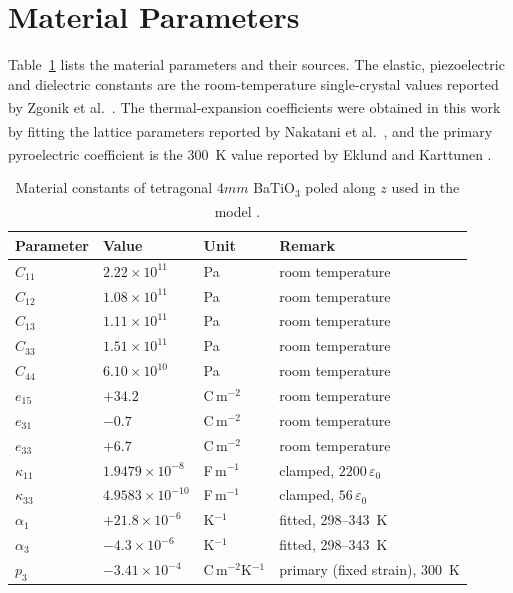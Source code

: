 \documentclass[a4paper, 11pt, twoside]{article}
\newcommand{\supercite}[1]{\!\!\textsuperscript{\cite{#1}}}
\begin{document}
\section{Material Parameters}
\label{sec:materials}

Table~\ref{tab:materials} lists the material parameters and their sources. The elastic,
piezoelectric and dielectric constants are the room-temperature single-crystal values
reported by Zgonik et al.\ \supercite{Zgonik1994}. The thermal-expansion coefficients were
obtained in this work by fitting the lattice parameters reported by Nakatani et al.\
\supercite{Nakatani2016}, and the primary pyroelectric coefficient is the 300~K value
reported by Eklund and Karttunen \supercite{EklundKarttunen2023}.

\begin{table}[h]
\centering
\small
\caption{Material constants of tetragonal $4mm$ BaTiO$_3$ poled along $z$ used in
the model \supercite{Zgonik1994,Nakatani2016,EklundKarttunen2023}.}
\label{tab:materials}
\begin{tabular}{@{}llll@{}}
\toprule
Parameter & Value & Unit & Remark \\
\midrule
$C_{11}$ & $2.22\times10^{11}$ & Pa & room temperature \\
$C_{12}$ & $1.08\times10^{11}$ & Pa & room temperature \\
$C_{13}$ & $1.11\times10^{11}$ & Pa & room temperature \\
$C_{33}$ & $1.51\times10^{11}$ & Pa & room temperature \\
$C_{44}$ & $6.10\times10^{10}$ & Pa & room temperature \\
$e_{15}$ & $+34.2$ & C\,m$^{-2}$ & room temperature \\
$e_{31}$ & $-0.7$ & C\,m$^{-2}$ & room temperature \\
$e_{33}$ & $+6.7$ & C\,m$^{-2}$ & room temperature \\
$\kappa_{11}$ & $1.9479\times10^{-8}$ & F\,m$^{-1}$ & clamped, $2200\,\varepsilon_0$ \\
$\kappa_{33}$ & $4.9583\times10^{-10}$ & F\,m$^{-1}$ & clamped, $56\,\varepsilon_0$ \\
$\alpha_1$ & $+21.8\times10^{-6}$ & K$^{-1}$ & fitted, 298--343~K \\
$\alpha_3$ & $-4.3\times10^{-6}$ & K$^{-1}$ & fitted, 298--343~K \\
$p_3$ & $-3.41\times10^{-4}$ & C\,m$^{-2}$K$^{-1}$ & primary (fixed strain), 300~K \\
\bottomrule
\end{tabular}
\end{table}
\end{document}
